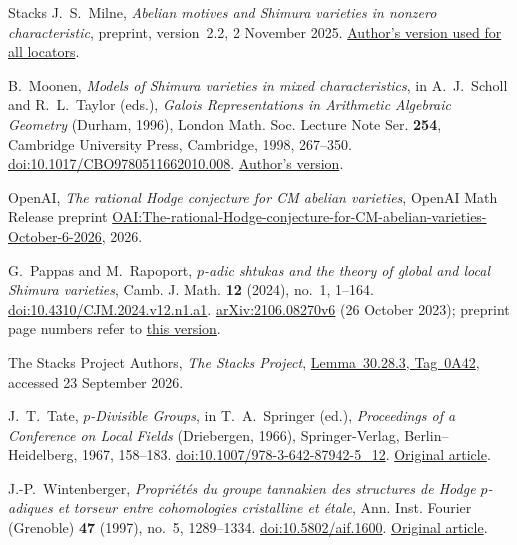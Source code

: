 \begin{thebibliography}{Stacks}
J.~S.~Milne,
\emph{Abelian motives and Shimura varieties in nonzero characteristic},
preprint, version~2.2, 2 November 2025.
\href{https://www.jmilne.org/math/articles/SVp.pdf}{Author's version used for all locators}.

B.~Moonen,
\emph{Models of Shimura varieties in mixed characteristics},
in A.~J.~Scholl and R.~L.~Taylor (eds.),
\emph{Galois Representations in Arithmetic Algebraic Geometry}
(Durham, 1996), London Math. Soc. Lecture Note Ser. \textbf{254},
Cambridge University Press, Cambridge, 1998, 267--350.
\href{https://doi.org/10.1017/CBO9780511662010.008}{doi:10.1017/CBO9780511662010.008}.
\href{https://www.math.ru.nl/personal/bmoonen/Papers/SMCfinal.pdf}{Author's version}.

OpenAI,
\emph{The rational Hodge conjecture for CM abelian varieties},\newline
OpenAI Math Release preprint
\href{https://github.com/openai/math/blob/main/preprints/The-rational-Hodge-conjecture-for-CM-abelian-varieties-October-6-2026/paper.pdf}{OAI:The-rational-Hodge-conjecture-for-CM-abelian-varieties-October-6-2026},
2026.

G.~Pappas and M.~Rapoport,
\emph{$p$-adic shtukas and the theory of global and local Shimura varieties},
Camb. J. Math. \textbf{12} (2024), no.~1, 1--164.
\href{https://doi.org/10.4310/CJM.2024.v12.n1.a1}{doi:10.4310/CJM.2024.v12.n1.a1}.
\href{https://arxiv.org/abs/2106.08270v6}{arXiv:2106.08270v6}
(26 October 2023); preprint page numbers refer to
\href{https://arxiv.org/pdf/2106.08270v6}{this version}.

The Stacks Project Authors,
\emph{The Stacks Project},
\href{https://stacks.math.columbia.edu/tag/0A42}{Lemma~30.28.3, Tag~0A42},
accessed 23 September 2026.

J.~T.~Tate,
\emph{$p$-Divisible Groups},
in T.~A.~Springer (ed.), \emph{Proceedings of a Conference on Local Fields}
(Driebergen, 1966), Springer-Verlag, Berlin--Heidelberg, 1967, 158--183.
\href{https://doi.org/10.1007/978-3-642-87942-5_12}{doi:10.1007/978-3-642-87942-5\_12}.
\href{https://www.math.purdue.edu/~tongliu/teaching/598/p-divisible.pdf}{Original article}.

J.-P.~Wintenberger,
\emph{Propri\'et\'es du groupe tannakien des structures de Hodge $p$-adiques
et torseur entre cohomologies cristalline et \'etale},
Ann. Inst. Fourier (Grenoble) \textbf{47} (1997), no.~5, 1289--1334.
\href{https://doi.org/10.5802/aif.1600}{doi:10.5802/aif.1600}.
\href{https://www.numdam.org/item/10.5802/aif.1600.pdf}{Original article}.

\end{thebibliography}
